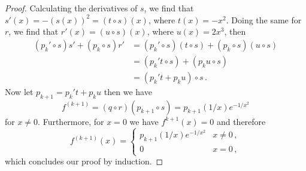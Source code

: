 \documentclass[week=6]{homework}
\begin{document}
\begin{questions}
\begin{parts}
\begin{proof}
		    	Calculating the derivatives of $s$, we find that $s'(x) = -(s(x))^2 = (t \circ s)(x)$, where $t(x) = -x^2$. Doing the same for $r$, we find that $r'(x) = (u \circ s)(x)$, where $u(x) = 2x^3$, then
		    	\begin{align*}
			    	(p_k' \circ s)s'  + (p_k \circ s)r' &= (p_k' \circ s)(t \circ s)  + (p_k \circ s)(u \circ s) \\
			    	&= (p_k't \circ s)  + (p_ku \circ s) \\
			    	&= (p_k't + p_ku)\circ s\,.
		    	\end{align*}
		    	Now let $p_{k+1} = p_k't + p_ku$
		    	then we have
		    	\[
			    	f^{(k+1)} = (q\circ r)(p_{k+1}\circ s)= p_{k+1}(1/x)e^{-1/x^2}
			    \]
			    for $x \neq 0$. Furthermore, for $x = 0$ we have $f^{k+1}(x) = 0$ and therefore
		    	\[
		    	f^{(k+1)}(x) = \begin{cases} p_{k+1}(1/x)e^{-1/x^2} & x\neq 0\,, \\ 0 & x = 0\,, \end{cases}
		    	\]
		    	which concludes our proof by induction.
	    	\end{proof}
	    \end{parts}
     \end{questions}
\end{document}
